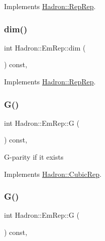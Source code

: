 Implements \mbox{\hyperlink{structHadron_1_1RepRep_a92c8802e5ed7afd7da43ccfd5b7cd92b}{Hadron\+::\+Rep\+Rep}}.

\mbox{\label{structHadron_1_1EmRep_a446425f715385b4b8ac879d3ffec864f}} 
\subsubsection{\texorpdfstring{dim()}{dim()}\hspace{0.1cm}{\footnotesize\ttfamily [3/3]}}
{\footnotesize\ttfamily int Hadron\+::\+Em\+Rep\+::dim (\begin{DoxyParamCaption}{ }\end{DoxyParamCaption}) const\hspace{0.3cm}{\ttfamily [inline]}, {\ttfamily [virtual]}}



Implements \mbox{\hyperlink{structHadron_1_1RepRep_a92c8802e5ed7afd7da43ccfd5b7cd92b}{Hadron\+::\+Rep\+Rep}}.

\mbox{\label{structHadron_1_1EmRep_aaed5af7f3ec6657d7a9f34e4c016182d}} 
\subsubsection{\texorpdfstring{G()}{G()}\hspace{0.1cm}{\footnotesize\ttfamily [1/2]}}
{\footnotesize\ttfamily int Hadron\+::\+Em\+Rep\+::G (\begin{DoxyParamCaption}{ }\end{DoxyParamCaption}) const\hspace{0.3cm}{\ttfamily [inline]}, {\ttfamily [virtual]}}

G-\/parity if it exists 

Implements \mbox{\hyperlink{structHadron_1_1CubicRep_a52104e43266d1614c00bbd1c3b395458}{Hadron\+::\+Cubic\+Rep}}.

\mbox{\label{structHadron_1_1EmRep_aaed5af7f3ec6657d7a9f34e4c016182d}} 
\subsubsection{\texorpdfstring{G()}{G()}\hspace{0.1cm}{\footnotesize\ttfamily [2/2]}}
{\footnotesize\ttfamily int Hadron\+::\+Em\+Rep\+::G (\begin{DoxyParamCaption}{ }\end{DoxyParamCaption}) const\hspace{0.3cm}{\ttfamily [inline]}, {\ttfamily [virtual]}}

